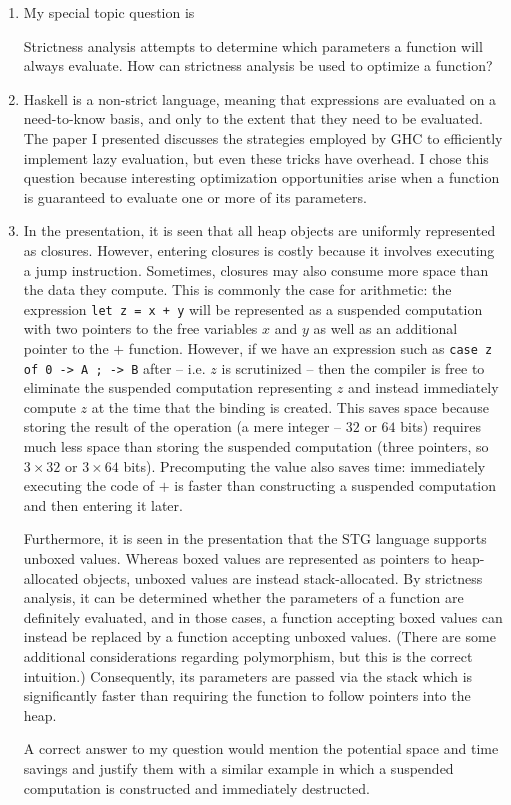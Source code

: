 \documentclass[letterpaper,11pt]{article}
\newcommand{\codesnip}{\texttt}
\begin{document}
\begin{enumerate}
  \item
    My special topic question is
    \begin{displayquote}
      Strictness analysis attempts to determine which parameters a function
      will always evaluate. How can strictness analysis be used to optimize a
      function?
    \end{displayquote}

  \item
    Haskell is a non-strict language, meaning that expressions are evaluated on
    a need-to-know basis, and only to the extent that they need to be
    evaluated. The paper I presented discusses the strategies employed by GHC
    to efficiently implement lazy evaluation, but even these tricks have
    overhead. I chose this question because interesting optimization
    opportunities arise when a function is guaranteed to evaluate one or more
    of its parameters.

  \item
    In the presentation, it is seen that all heap objects are uniformly
    represented as closures. However, entering closures is costly because it
    involves executing a jump instruction. Sometimes, closures may also consume
    more space than the data they compute. This is commonly the case for
    arithmetic: the expression \codesnip{let z = x + y} will be represented as
    a suspended computation with two pointers to the free variables
    $x$ and $y$ as well as an additional pointer to the $+$ function. However,
    if we have an expression such as
    \codesnip{case z of 0 -> A ; \textunderscore{} -> B}
    after -- i.e. $z$ is scrutinized -- then the compiler is free
    to eliminate the suspended computation representing $z$ and instead
    immediately compute $z$ at the time that the binding is created. This saves
    space because storing the result of the operation (a mere integer -- $32$
    or $64$ bits) requires much less space than storing the suspended
    computation (three pointers, so $3 \times 32$ or $3 \times 64$ bits).
    Precomputing the value also saves time: immediately executing the code of
    $+$ is faster than constructing a suspended computation and then entering
    it later.

    Furthermore, it is seen in the presentation that the STG language supports
    unboxed values. Whereas boxed values are represented as pointers to
    heap-allocated objects, unboxed values are instead stack-allocated. By
    strictness analysis, it can be determined whether the parameters of a
    function are definitely evaluated, and in those cases, a function accepting
    boxed values can instead be replaced by a function accepting unboxed
    values. (There are some additional considerations regarding polymorphism,
    but this is the correct intuition.) Consequently, its parameters are passed
    via the stack which is significantly faster than requiring the function to
    follow pointers into the heap.

    A correct answer to my question would mention the potential space and time
    savings and justify them with a similar example in which a suspended
    computation is constructed and immediately destructed.
\end{enumerate}
\end{document}
